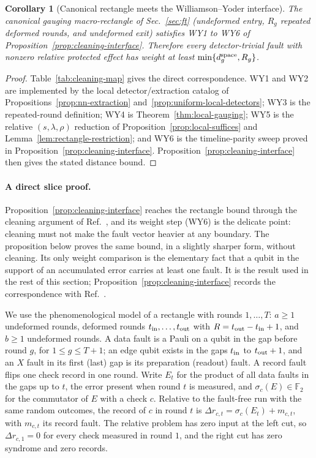 \documentclass[aps,prx,reprint,superscriptaddress,nofootinbib,floatfix,longbibliography]{revtex4-2}
\newtheorem{corollary}[theorem]{Corollary}
\theoremstyle{definition}
\begin{document}
\begin{corollary}[Canonical rectangle meets the Williamson--Yoder interface]
\label{prop:wy-bridge}
The canonical gauging macro-rectangle of Sec.~\ref{sec:ft} (undeformed entry,
$R_g$ repeated deformed rounds, and undeformed exit) satisfies WY1 to WY6 of
Proposition~\ref{prop:cleaning-interface}.  Therefore every detector-trivial fault
with nonzero relative protected effect has weight at least
$\min\{d_g^{\rm space},R_g\}$.
\end{corollary}
\begin{proof}
Table~\ref{tab:cleaning-map} gives the direct correspondence.  WY1 and WY2 are
implemented by the local detector/extraction catalog of
Propositions~\ref{prop:nn-extraction} and~\ref{prop:uniform-local-detectors};
WY3 is the repeated-round definition; WY4 is Theorem~\ref{thm:local-gauging};
WY5 is the relative $(s,\lambda,\rho)$ reduction of
Proposition~\ref{prop:local-suffices} and Lemma~\ref{lem:rectangle-restriction};
and WY6 is the timeline-parity sweep proved in
Proposition~\ref{prop:cleaning-interface}.  Proposition~\ref{prop:cleaning-interface}
then gives the stated distance bound.
\end{proof}

\paragraph{A direct slice proof.}
Proposition~\ref{prop:cleaning-interface} reaches the rectangle bound through
the cleaning argument of Ref.~\cite{WilliamsonYoderGauging}, and its weight
step (WY6) is the delicate point: cleaning must not make the fault vector
heavier at any boundary.  The proposition below proves the same bound, in a
slightly sharper form, without cleaning.  Its only weight comparison is the
elementary fact that a qubit in the support of an accumulated error carries
at least one fault.  It is the result used in the rest of this section;
Proposition~\ref{prop:cleaning-interface} records the correspondence with
Ref.~\cite{WilliamsonYoderGauging}.

We use the phenomenological model of a rectangle with rounds $1,\dots,T$:
$a\ge1$ undeformed rounds, deformed rounds $t_{\rm in},\dots,t_{\rm out}$
with $R=t_{\rm out}-t_{\rm in}+1$, and $b\ge1$ undeformed rounds.  A data
fault is a Pauli on a qubit in the gap before round $g$, for
$1\le g\le T+1$; an edge qubit exists in the gaps $t_{\rm in}$ to
$t_{\rm out}+1$, and an $X$ fault in its first (last) gap is its preparation
(readout) fault.  A record fault flips one check record in one round.  Write
$E_t$ for the product of all data faults in the gaps up to $t$, the error
present when round $t$ is measured, and $\sigma_c(E)\in\mathbb F_2$ for the
commutator of $E$ with a check $c$.  Relative to the fault-free run with the
same random outcomes, the record of $c$ in round $t$ is
$\Delta r_{c,t}=\sigma_c(E_t)+m_{c,t}$, with $m_{c,t}$ its record fault.
The relative problem has zero input at the left cut, so
$\Delta r_{c,1}=0$ for every check measured in round $1$, and the right cut
has zero syndrome and zero records.
\end{document}
